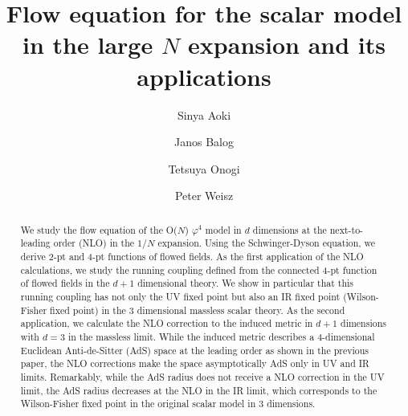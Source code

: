 \documentclass[preprint]{ptephy_v1}%
\begin{document}
\title{Flow equation for  the scalar model in the large $N$ expansion and its applications}


\author{Sinya Aoki}

\author{Janos Balog}

\author{Tetsuya Onogi} 

\author{Peter Weisz}



\begin{abstract}
We study the flow equation of the O($N$) $\varphi^4$ model in $d$ dimensions at the next-to-leading order (NLO) in the $1/N$ expansion.
Using the Schwinger-Dyson equation, we derive 2-pt and 4-pt functions of flowed fields. 
As the first application of the NLO calculations, 
we study  the running coupling defined from the connected 4-pt function of flowed fields
in the $d+1$ dimensional theory. We show in particular that this running coupling
has not only the UV fixed point but also  an IR fixed point (Wilson-Fisher fixed point) in  the 3 dimensional massless scalar theory.   
As the second application, we calculate the NLO correction to the induced metric in $d+1$ dimensions with $d=3$
in the massless limit. While the induced metric describes a 4-dimensional Euclidean Anti-de-Sitter (AdS)  space at the leading order as shown in the previous paper,  the NLO corrections make the space asymptotically  AdS  only in UV and IR limits. Remarkably, while the AdS radius  does not receive  a NLO correction in the UV limit, the AdS radius decreases at the NLO  in the IR limit, which corresponds to the Wilson-Fisher fixed point in the original scalar model in 3 dimensions.
\end{abstract}
\end{document}
